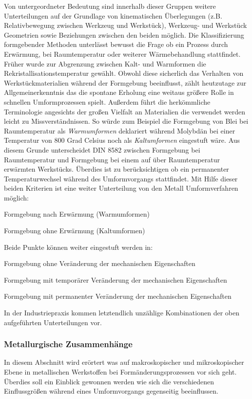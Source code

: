 \documentclass[12pt,a4paper,parskip,twoside,BCOR5mm,headsepline]{scrartcl}
\begin{document}
\begin{description*}
{Von untergeordneter Bedeutung sind innerhalb dieser Gruppen  weitere Unterteilungen auf der Grundlage von kinematischen Überlegungen (z.B. Relativbewegung zwischen Werkzeug und Werkstück), Werkzeug- und Werkstück Geometrien sowie Beziehungen zwischen den beiden möglich. Die Klassifizierung formgebender Methoden unterlässt bewusst die Frage ob ein Prozess durch Erwärmung, bei Raumtemperatur oder weiterer Wärmebehandlung stattfindet. Früher  wurde zur Abgrenzung zwischen Kalt- und Warmformen die Rekristallisationstemperatur gewählt. Obwohl diese sicherlich das Verhalten  von Werkstückmaterialien während der Formgebung beeinflusst, zählt heutzutage zur Allgemeinerkenntnis das die spontane Erholung  eine weitaus größere Rolle in schnellen Umformprozessen spielt. Außerdem führt die herkömmliche Terminologie angesichts der großen Vielfalt  an Materialien die verwendet werden leicht zu Missverständnissen. So würde zum Beispiel die Formgebung von Blei bei Raumtemperatur als \emph{Warmumformen} deklariert während Molybdän bei einer Temperatur von 800 Grad Celsius noch als \emph{Kaltumformen} eingestuft wäre. Aus diesem Grunde unterscheidet DIN 8582 zwischen Formgebung bei Raumtemperatur und Formgebung bei einem auf über Raumtemperatur erwärmten Werkstücks. Überdies ist zu berücksichtigen ob ein permanenter Temperaturwechsel während des Umformvorgangs stattfindet. Mit Hilfe dieser beiden Kriterien ist eine weiter Unterteilung von den Metall Umformverfahren möglich:

\begin{enumerate*}
\item Formgebung nach Erwärmung (Warmumformen)
\item Formgebung ohne Erwärmung (Kaltumformen)
\end{enumerate*}

Beide Punkte können weiter eingestuft werden in:

\begin{itemize*}
\item Formgebung ohne Veränderung der mechanischen Eigenschaften
\item Formgebung mit temporärer Veränderung der mechanischen Eigenschaften
\item Formgebung mit permanenter Veränderung der mechanischen Eigenschaften
\end{itemize*}

In der Industriepraxis kommen letztendlich unzählige Kombinationen der oben aufgeführten Unterteilungen vor.\autocite[2.1ff]{kl}
\subsubsection{Metallurgische Zusammenhänge}
In diesem Abschnitt wird erörtert was auf makroskopischer und mikroskopischer Ebene in metallischen Werkstoffen bei Formänderungsprozessen vor sich geht. Überdies soll ein Einblick gewonnen werden wie sich die verschiedenen Einflussgrößen während eines Umformvorgangs gegenseitig beeinflussen.


}
\end{description*}
\end{document}
